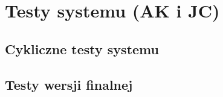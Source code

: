 \chapter{Testy systemu (AK i JC)}
\label{cha:tests}

\section{Cykliczne testy systemu}

\section{Testy wersji finalnej}